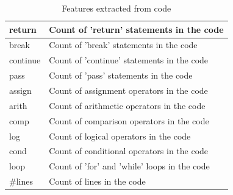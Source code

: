 \begin{table}[H]
\centering
\caption{Features extracted from code}
\begin{tabular}{|l|l|} 
\hline
return       & Count of 'return' statements in the code      \\ 
\hline
break        & Count of 'break' statements in the code       \\ 
\hline
continue     & Count of 'continue' statements in the code    \\ 
\hline
pass         & Count of 'pass' statements in the code        \\ 
\hline
assign       & Count of assignment operators in the code     \\ 
\hline
arith        & Count of arithmetic operators in the code     \\ 
\hline
comp         & Count of comparison operators in the code     \\ 
\hline
log          & Count of logical operators in the code        \\ 
\hline
cond         & Count of conditional operators in the code    \\ 
\hline
loop         & Count of 'for' and 'while' loops in the code  \\ 
\hline
\#lines      & Count of lines in the code                    \\ 
\hline
\end{tabular}




\end{table}








